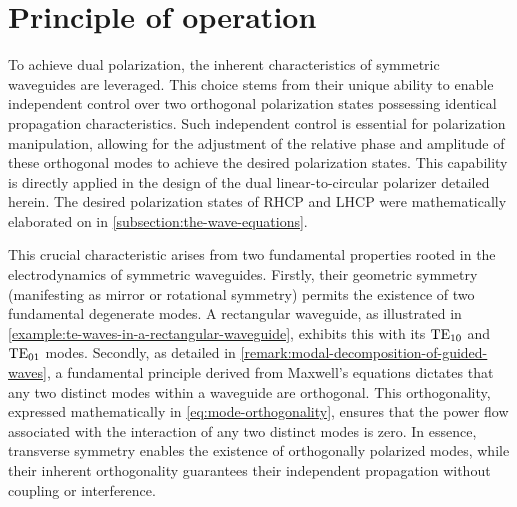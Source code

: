 \documentclass[11pt,a4paper,twoside,openany]{report}
\begin{document}
\section{Principle of operation}
To achieve dual polarization, the inherent characteristics of symmetric waveguides are leveraged. This choice stems from their unique ability to enable independent control over two orthogonal polarization states possessing identical propagation characteristics.  Such independent control is essential for polarization manipulation, allowing for the adjustment of the relative phase and amplitude of these orthogonal modes to achieve the desired polarization states. This capability is directly applied in the design of the dual linear-to-circular polarizer detailed herein. The desired polarization states of RHCP and LHCP were mathematically elaborated on in \cref{subsection:the-wave-equations}.

This crucial characteristic arises from two fundamental properties rooted in the electrodynamics of symmetric waveguides. Firstly, their geometric symmetry (manifesting as mirror or rotational symmetry) permits the existence of two fundamental degenerate modes. A rectangular waveguide, as illustrated in \cref{example:te-waves-in-a-rectangular-waveguide}, exhibits this with its $\text{TE}_{10}$ and $\text{TE}_{01}$ modes. Secondly, as detailed in \cref{remark:modal-decomposition-of-guided-waves}, a fundamental principle derived from Maxwell's equations dictates that any two distinct modes within a waveguide are orthogonal. This orthogonality, expressed mathematically in \cref{eq:mode-orthogonality}, ensures that the power flow associated with the interaction of any two distinct modes is zero. In essence, transverse symmetry enables the existence of orthogonally polarized modes, while their inherent orthogonality guarantees their independent propagation without coupling or interference.
\end{document}
